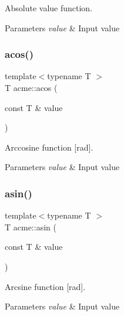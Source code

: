 Absolute value function. 


\begin{DoxyParams}{Parameters}
{\em value} & Input value \\
\hline
\end{DoxyParams}
\mbox{\label{namespaceacme_a9ea04b104383cbb01ba4b6bc8fbd1823}} 
\subsubsection{\texorpdfstring{acos()}{acos()}}
{\footnotesize\ttfamily template$<$typename T $>$ \\
T acme\+::acos (\begin{DoxyParamCaption}\item[{const T \&}]{value }\end{DoxyParamCaption})\hspace{0.3cm}{\ttfamily [inline]}}



Arccosine function \mbox{[}rad\mbox{]}. 


\begin{DoxyParams}{Parameters}
{\em value} & Input value \\
\hline
\end{DoxyParams}
\mbox{\label{namespaceacme_a8c712ed5d1336fab688be5cd7c6afd07}} 
\subsubsection{\texorpdfstring{asin()}{asin()}}
{\footnotesize\ttfamily template$<$typename T $>$ \\
T acme\+::asin (\begin{DoxyParamCaption}\item[{const T \&}]{value }\end{DoxyParamCaption})\hspace{0.3cm}{\ttfamily [inline]}}



Arcsine function \mbox{[}rad\mbox{]}. 


\begin{DoxyParams}{Parameters}
{\em value} & Input value \\
\hline
\end{DoxyParams}
\mbox{\label{namespaceacme_ab9d8ecb26b9bc01ea9e8906489d709bf}} 
